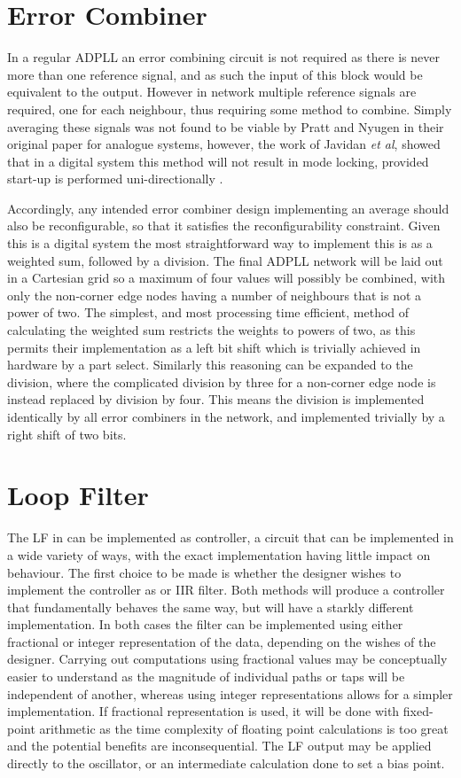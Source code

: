 \section{Error Combiner}
In a regular \ac{ADPLL} an error combining circuit is not required as there is never more than one reference signal, and as such the input of this block would be equivalent to the output. However in  network multiple reference signals are required, one for each neighbour, thus requiring some method to combine. Simply averaging these signals was not found to be viable by Pratt and Nyugen in their original paper for analogue systems, however, the work of Javidan \textit{et al}, showed that in a digital system this method will not result in mode locking, provided start-up is performed uni-directionally \cite{javidan2011all}.

Accordingly, any intended error combiner design implementing an average should also be reconfigurable, so that it satisfies the reconfigurability constraint. Given this is a digital system the most straightforward way to implement this is as a weighted sum, followed by a division. The final \ac{ADPLL} network will be laid out in a Cartesian grid so a maximum of four values will possibly be combined, with only the non-corner edge nodes having a number of neighbours that is not a power of two.
The simplest, and most processing time efficient, method of calculating the weighted sum restricts the weights to powers of two, as this permits their implementation as a left bit shift which is trivially achieved in hardware by a part select.
Similarly this reasoning can be expanded to the division, where the complicated division by three for a non-corner edge node is instead replaced by division by four. This means the division is implemented identically by all error combiners in the network, and implemented trivially by a right shift of two bits.%

\section{Loop Filter}
The \acl{LF} in  can be implemented as  controller, a circuit that can be implemented in a wide variety of ways, with the exact implementation having little impact on behaviour. The first choice to be made is whether the designer wishes to implement the controller as  or \ac{IIR} filter. Both methods will produce a controller that fundamentally behaves the same way, but will have a starkly different implementation. In both cases the filter can be implemented using either fractional or integer representation of the data, depending on the wishes of the designer. Carrying out computations using fractional values may be conceptually easier to understand as the magnitude of individual paths or taps will be independent of another, whereas using integer representations allows for a simpler implementation. If fractional representation is used, it will be done with fixed-point arithmetic as the time complexity of floating point calculations is too great and the potential benefits are inconsequential. The \acl{LF} output may be applied directly to the oscillator, or an intermediate calculation done to set a bias point.

